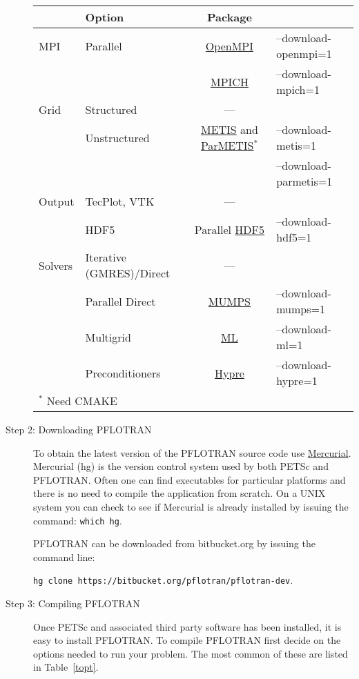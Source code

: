 \begin{description}
\begin{table}[H]
\vspace{3mm}

\begin{tabular}{llcl}
\toprule
& Option & Package\\
\midrule
MPI & Parallel & \href{http://www.open-mpi.org/}{OpenMPI} & --download-openmpi=1\\
&& \href{http://www.mpich.org/}{MPICH} &--download-mpich=1\\
\midrule
Grid & Structured & ---\\
& Unstructured & \href{http://glaros.dtc.umn.edu/gkhome/views/metis}{METIS} and \href{http://glaros.dtc.umn.edu/gkhome/views/metis}{ParMETIS}$^*$ & --download-metis=1\\
&&& --download-parmetis=1\\
\midrule
Output & TecPlot, VTK & ---\\
& HDF5 & Parallel \href{http://www.hdfgroup.org/HDF5/}{HDF5} & --download-hdf5=1\\
\midrule
Solvers & Iterative (GMRES)/Direct & ---\\
& Parallel Direct & \href{http://graal.ens-lyon.fr/MUMPS/}{MUMPS} & --download-mumps=1\\
& Multigrid & \href{http://trilinos.sandia.gov/packages/ml/}{ML} & --download-ml=1\\
& Preconditioners & \href{http://acts.nersc.gov/hypre/}{Hypre} & --download-hypre=1\\
\bottomrule
\multicolumn{2}{l}{$^*$ Need CMAKE}
\end{tabular}
\end{table}

\item[Step 2: Downloading PFLOTRAN] To obtain the latest version of the PFLOTRAN source code use \href{http://mercurial.selenic.com/}{Mercurial}. Mercurial (hg) is the version control system used by both PETSc and PFLOTRAN. Often one can find executables for particular platforms and there is no need to compile the application from scratch. On a UNIX system you can check to see if Mercurial is already installed by issuing the command: {\footnotesize\tt which hg}.

PFLOTRAN can be downloaded from bitbucket.org by issuing the command line:

{\footnotesize\tt hg clone https://bitbucket.org/pflotran/pflotran-dev}.

\item[Step 3: Compiling PFLOTRAN] Once PETSc and associated third party software has been installed, it is easy to install PFLOTRAN. To compile PFLOTRAN first decide on the options needed to run your problem. The most common of these are listed in Table~\ref{topt}.


\end{description}
